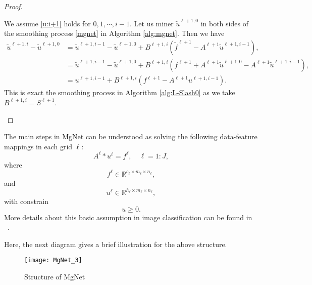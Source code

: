 \begin{proof}
\begin{itemize}
\begin{itemize}
			We assume \eqref{u:i+1} holds for $0,1,\cdots,i-1$. Let us miner $\tilde u^{\ell+1, 0}$ in both sides of 
			the smoothing process \eqref{mgnet} in Algorithm \ref{alg:mgnet}. Then we have
			\begin{align*}
			\tilde u^{\ell+1,i} - \tilde u^{\ell+1, 0} &= \tilde u^{\ell+1,i-1} - \tilde u^{\ell+1, 0} + B^{\ell+1,i} (\tilde f^{\ell+1} - A^{\ell+1} \tilde u^{\ell+1,i-1}), \\
			&= \tilde u^{\ell+1,i-1} - \tilde u^{\ell+1, 0} + B^{\ell+1,i} (f^{\ell+1} + A^{\ell+1}\tilde u^{\ell+1,0} - A^{\ell+1} \tilde u^{\ell+1,i-1} ),\\ 
			&= u^{\ell+1,i-1} + B^{\ell+1,i} (f^{\ell+1} - A^{\ell+1}u^{\ell+1,i-1} ).
			\end{align*}
			This is exact the smoothing process in Algorithm \ref{alg:L-Slash0} as we take $ B^{\ell+1,i} = S^{\ell+1}$.
		\end{itemize}
	\end{itemize}
\end{proof}


The main steps in MgNet can be understood 
as solving the following  data-feature mappings in each grid $\ell$:
\begin{equation}
\label{Auf-ell}
A^\ell \ast u^\ell = f^\ell, \quad \ell=1:J,
\end{equation}
where
\begin{equation}
\label{f-ell}
f^{\ell}\in\mathbb R^{c_\ell \times m_\ell\times n_\ell},
\end{equation}
and 
\begin{equation}
\label{u-ell}
u^{\ell}\in\mathbb R^{h_\ell\times m_\ell\times n_\ell},
\end{equation}
with constrain
\begin{equation}\label{key}
u \ge 0.
\end{equation}
More details about this basic assumption in image classification can be found in 
~\cite{he2019constrained}.

Here, the next diagram gives a brief illustration for the above 
	structure.\\
\begin{figure}[H]
	\begin{center}
		\texttt{[image: MgNet\_3]} 
	\end{center}
	\caption{Structure of MgNet}
	\label{fig:mgnet}
\end{figure}

